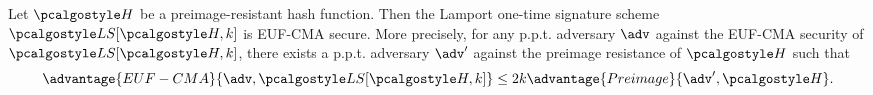 \begin{theorem}\label{thm:ots-lamport-euf-cma}
    Let $\algo{H}$ be a preimage-resistant hash function.
    Then the Lamport one-time signature scheme $\algo{LS}[\algo{H, k}]$ is EUF-CMA secure.
    More precisely, for any p.p.t. adversary $\adv$ against the EUF-CMA security of $\algo{LS}[\algo{H, k}]$,
    there exists a p.p.t. adversary $\adv'$ against the preimage resistance of $\algo{H}$ such that
    \[
    \advantage{EUF-CMA}{\adv, \algo{LS}[\algo{H, k}]} \leq 2k\advantage{Preimage}{\adv', \algo{H}}.
    \]
\end{theorem}

\begin{figure}[tbh]
 \begin{tcolorbox}%
  \begin{pchstack}[center]
  \begin{pcvstack}
   \pcvspace
  \end{pcvstack}
  \pchspace
   \begin{pcvstack}
\end{pcvstack}
\end{pchstack}
\end{tcolorbox}
\end{figure}
